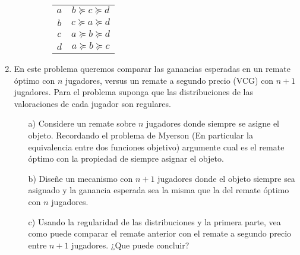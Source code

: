 \documentclass[letterpaper,12pt]{article}
\begin{document}
\begin{enumerate}[\bf P1.]
\begin{itemize}
\begin{figure}[H]
\begin{minipage}{.3\textwidth}
\label{fig:f2}
  
\end{minipage}%
\begin{minipage}{.3\textwidth}
\centering
\begin{tabular}{|c|c|}
    \hline
    $a$ & $b \succeq c \succeq d$ \\
    $b$ & $c \succeq a \succeq d$ \\
    $c$ & $a \succeq b \succeq d$ \\
    $d$ & $a \succeq b \succeq c$ \\
    \hline
\end{tabular}
\label{tab:t1}
     
  
\end{minipage}%


\end{figure}
 
\end{itemize}



\item En este problema queremos comparar las ganancias esperadas en un remate óptimo con $n$ jugadores, versus un remate a segundo precio (VCG) con $n+1$ jugadores. Para el problema suponga que las distribuciones de las valoraciones de cada jugador son regulares. 
\begin{itemize}
\item[a)] Considere un remate sobre $n$ jugadores donde siempre se asigne el objeto. Recordando el problema de Myerson (En particular la equivalencia entre dos funciones objetivo) argumente cual es el remate óptimo con la propiedad de siempre asignar el objeto.

\item[b)] Diseñe un mecanismo con $n+1$ jugadores donde el objeto siempre sea asignado y la ganancia esperada sea la misma que la del remate óptimo con $n$ jugadores.

\item[c)] Usando la regularidad de las distribuciones y la primera parte, vea como puede comparar el remate anterior con el remate a segundo precio entre $n+1$ jugadores. ¿Que puede concluir?
\end{itemize}


\end{enumerate}
\end{document}

